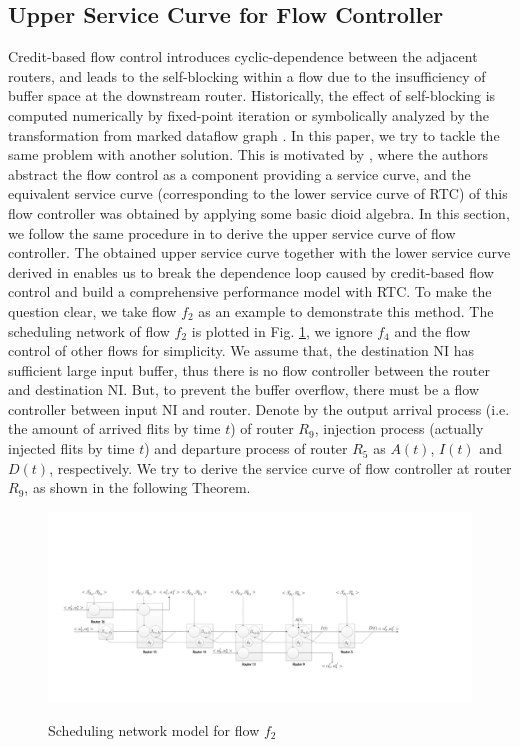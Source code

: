 \documentclass[10pt,journal]{IEEEtran}
\begin{document}
\subsection{Upper Service Curve for Flow Controller}\label{flowcontrol}
Credit-based flow control introduces cyclic-dependence between the adjacent routers, and leads to the self-blocking within a flow due to the insufficiency of buffer space at the downstream router. Historically, the effect of self-blocking is computed numerically by fixed-point iteration \cite{schioler2005network} or symbolically analyzed by the transformation from marked dataflow graph \cite{Thiele:2009:MPA:1629335.1629353}. In this paper, we try to tackle the same problem with another solution. This is motivated by \cite{qian2009analysis}, where the authors abstract the flow control as a component providing a service curve, and the equivalent service curve (corresponding to the lower service curve of RTC) of this flow controller was obtained by applying some basic dioid algebra. In this section, we follow the same procedure in \cite{qian2009analysis} to derive the upper service curve of flow controller. The obtained upper service curve together with the lower service curve derived in \cite{qian2009analysis} enables us to break the dependence loop caused by credit-based flow control and build a comprehensive performance model with RTC. To make the question clear, we take flow $f_2$ as an example to demonstrate this method. The scheduling network of flow $f_2$ is plotted in Fig. \ref{f2}, we ignore $f_4$ and the flow control of other flows for simplicity. We assume that, the destination NI has sufficient large input buffer, thus there is no flow controller between the router and destination NI. But, to prevent the buffer overflow, there must be a flow controller between input NI and router. Denote by the output arrival process (i.e. the amount of arrived flits by time $t$) of router $R_9$, injection process (actually injected flits by time $t$) and departure process of router $R_{5}$ as $A(t)$, $I(t)$ and $D(t)$, respectively. We try to derive the service curve of flow controller at router $R_9$, as shown in the following Theorem.
\begin{figure}
  \centering
  \includegraphics[scale=0.35]{figures/f2.pdf}\\
  \caption{Scheduling network model for flow $f_2$}\label{f2}
\end{figure}
\end{document}

